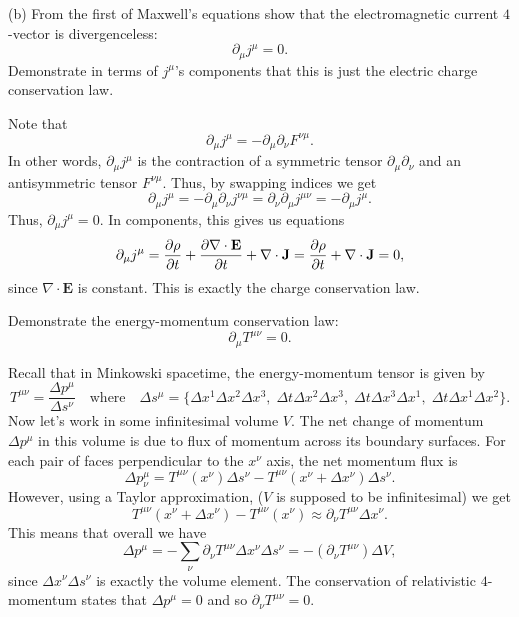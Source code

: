 \documentclass{../../templates/lkx_pset}
\begin{document}
\begin{parts}
	\begin{part}{(b)}
		From the first of Maxwell's equations show that the electromagnetic current $4$-vector is divergenceless:
		\[
			\partial_\mu j^\mu = 0.
		\]
		Demonstrate in terms of $j^\mu$'s components that this is just the electric charge conservation law.
	\end{part}
	Note that
  \[
    \partial_\mu j^\mu = -\partial_\mu \partial_\nu F^{\nu\mu}.
  \]
  In other words, $\partial_\mu j^\mu$ is the contraction of a symmetric tensor $\partial_\mu\partial_\nu$ and an antisymmetric tensor $F^{\nu\mu}$. Thus, by swapping indices we get
  \[ 
    \partial_\mu j^\mu = -\partial_{\mu}\partial_\nu j^{\nu\mu} = \partial_\nu\partial_\mu j^{\mu\nu} = - \partial_\mu j^\mu.
  \]
  Thus, $\partial_\mu j^\mu=0$. In components, this gives us equations
  \[
  \begin{aligned}
    \partial_\mu j^\mu = \frac{\partial \rho}{\partial t} + \frac{\partial \nabla\cdot \mathbf{E}}{\partial t} + \nabla \cdot\mathbf{J} = \frac{\partial \rho}{\partial t} + \nabla\cdot \mathbf{J} = 0,
  \end{aligned}
  \]
  since $\nabla\cdot \mathbf{E}$ is constant. This is exactly the charge conservation law.
\end{parts}

\begin{problem}{5}
Demonstrate the energy-momentum conservation law:
\[
	\partial_\mu T^{\mu\nu} = 0.
\]
\end{problem}
\begin{solution}
	Recall that in Minkowski spacetime, the energy-momentum tensor is given by
	\[
		T^{\mu\nu} = \frac{\Delta p^\mu}{\Delta s^\nu}\quad\textrm{where}\quad \Delta s^\mu = \{ \Delta x^1 \Delta x^2 \Delta x^3,\; \Delta t \Delta x^2 \Delta x^3,\; \Delta t \Delta x^3 \Delta x^1,\; \Delta t \Delta x^1 \Delta x^2\}.
	\]
	Now let's work in some infinitesimal volume $V$. The net change of momentum $\Delta p^\mu$ in this volume is due to flux of momentum across its boundary surfaces. For each pair of faces perpendicular to the $x^\nu$ axis, the net momentum flux is
	\[
    \Delta p^\mu_\nu = T^{\mu\nu} (x^\nu)\Delta s^\nu - T^{\mu\nu}(x^\nu + \Delta x^\nu) \Delta s^\nu.
	\]
	However, using a Taylor approximation, ($V$ is supposed to be infinitesimal) we get
	\[
    T^{\mu\nu}(x^\nu + \Delta x^\nu) - T^{\mu\nu}(x^\nu) \approx \partial_\nu T^{\mu\nu}\Delta x^\nu.
	\]
	This means that overall we have
	\[
    \Delta p^\mu = -\sum_\nu \partial_\nu T^{\mu\nu} \Delta x^\nu \Delta s^\nu = -(\partial_\nu T^{\mu\nu}) \Delta V,
	\]
	since $\Delta x^\nu \Delta s^\nu$ is exactly the volume element. The conservation of relativistic $4$-momentum states that $\Delta p^\mu=0$ and so $\partial_\nu T^{\mu\nu}=0$.
\end{solution}
\end{document}
